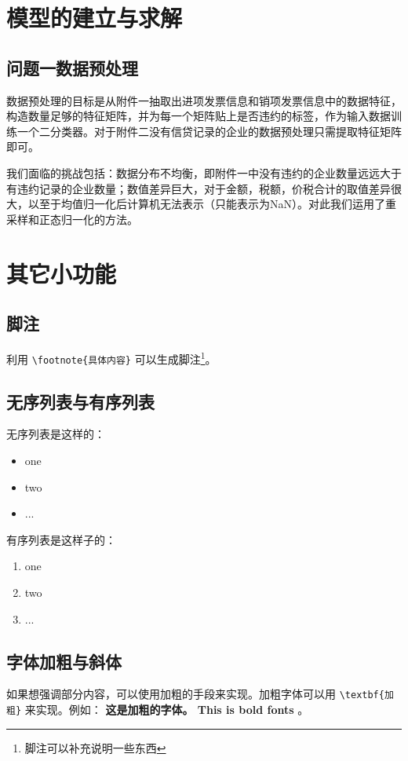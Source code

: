 \documentclass{cumcmthesis}
\begin{document}
\section{模型的建立与求解}
\subsection{问题一数据预处理}
数据预处理的目标是从附件一抽取出进项发票信息和销项发票信息中的数据特征，构造数量足够的特征矩阵，并为每一个矩阵贴上是否违约的标签，作为输入数据训练一个二分类器。对于附件二没有信贷记录的企业的数据预处理只需提取特征矩阵即可。

我们面临的挑战包括：数据分布不均衡，即附件一中没有违约的企业数量远远大于有违约记录的企业数量；数值差异巨大，对于金额，税额，价税合计的取值差异很大，以至于均值归一化后计算机无法表示（只能表示为NaN）。对此我们运用了重采样和正态归一化的方法。


\section{其它小功能}
\subsection{脚注}

利用 \verb|\footnote{具体内容}| 可以生成脚注\footnote{脚注可以补充说明一些东西}。

\subsection{无序列表与有序列表}

无序列表是这样的：
\begin{itemize}
    \item one
    \item two
    \item ...
\end{itemize}

有序列表是这样子的：
\begin{enumerate}
    \item one
    \item two
    \item ...
\end{enumerate}

\subsection{字体加粗与斜体}

如果想强调部分内容，可以使用加粗的手段来实现。加粗字体可以用 \verb|\textbf{加粗}| 来实现。例如： \textbf{这是加粗的字体。 This is bold fonts} 。
\end{document}
